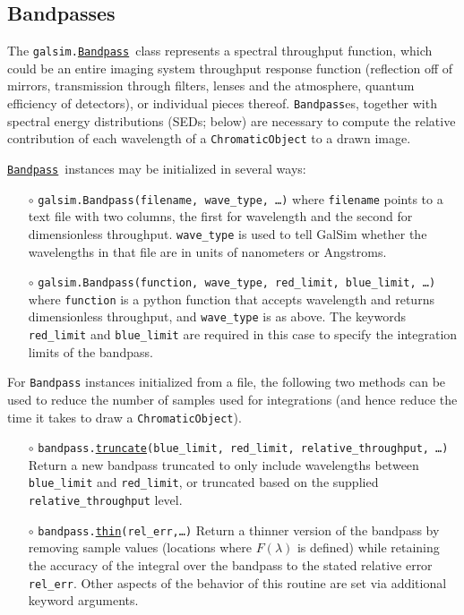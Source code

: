 \documentclass[preprint,10pt]{../../devel/modules/aastex}
\newcommand\Bandpass{\href{http://galsim-developers.github.io/GalSim/classgalsim_1_1bandpass_1_1_bandpass.html}{\texttt{Bandpass}}}
\begin{document}
\subsection{Bandpasses}

The \texttt{galsim.}\Bandpass\ class represents a spectral throughput function, which could be an
entire imaging system throughput response function (reflection off of mirrors, transmission through
filters, lenses and the atmosphere, quantum efficiency of detectors), or individual pieces thereof.
\texttt{Bandpass}es, together with spectral energy distributions (SEDs; below) are necessary to
compute the relative contribution of each wavelength of a \texttt{ChromaticObject} to a drawn image.

\Bandpass\ instances may be initialized in several ways:
\begin{itemize}
  \item[$\circ$]
  \texttt{galsim.Bandpass(filename, wave\_type, \dots)}
    \newline
    where \texttt{filename} points to a
    text file with two columns, the first for wavelength and the second for dimensionless
    throughput.  \texttt{wave\_type} is used to tell GalSim whether the wavelengths in that file are
    in units of nanometers or Angstroms.
  \item[$\circ$]
  \texttt{galsim.Bandpass(function, wave\_type, red\_limit, blue\_limit, \dots)}
    \newline
    where \texttt{function} is a python function that accepts wavelength and returns
    dimensionless throughput, and \texttt{wave\_type} is as above.
    The keywords \texttt{red\_limit} and \texttt{blue\_limit} are required in
    this case to specify the integration limits of the bandpass.
\end{itemize}

For \texttt{Bandpass} instances initialized from a file, the following two methods can be used to
reduce the number of samples used for integrations (and hence reduce the time it takes to draw
a \texttt{ChromaticObject}).
\begin{itemize}
  \item[$\circ$]
  \texttt{bandpass.\href{http://galsim-developers.github.io/GalSim/classgalsim_1_1bandpass_1_1_bandpass.html\#a230865a1e29ed8a95ea4b2c7d66a08a1}{truncate}(blue\_limit,
    red\_limit, relative\_throughput, \dots)}
    \newline
    Return a new bandpass truncated to only include wavelengths between \texttt{blue\_limit} and
    \texttt{red\_limit}, or truncated based on the supplied \texttt{relative\_throughput} level.
  \item[$\circ$]
  \texttt{bandpass.\href{http://galsim-developers.github.io/GalSim/classgalsim_1_1bandpass_1_1_bandpass.html\#a20a7b1813506e7441e03ef097f0d5bf1}{thin}(rel\_err,\dots)}
    \newline
   Return a thinner version of the bandpass by removing sample values (locations where
   $F(\lambda)$ is defined) while retaining the
   accuracy of the integral over the bandpass to the stated relative error \texttt{rel\_err}.  Other
   aspects of the behavior of this routine are set via additional keyword arguments.
\end{itemize}
\end{document}
